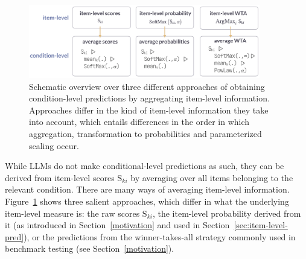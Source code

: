 \documentclass[fleqn]{article}
\begin{document}
\begin{figure}
  \centering
  \includegraphics[width=0.9\textwidth]{00-pics/measures-overview.png}
  \caption{
    Schematic overview over three different approaches of obtaining condition-level predictions by aggregating item-level information.
    Approaches differ in the kind of item-level information they take into account, which entails differences in the order in which aggregation, transformation to probabilities and parameterized scaling occur.
  }
  \label{fig:measures-overview}
\end{figure}

While LLMs do not make conditional-level predictions as such, they can be derived from item-level scores $\text{S}_{ki}$ by averaging over all items belonging to the relevant condition.
There are many ways of averaging item-level information.
Figure~\ref{fig:measures-overview} shows three salient approaches, which differ in what the underlying item-level measure is: the raw scores $\text{S}_{ki}$, the item-level probability derived from it (as introduced in Section~\ref{motivation} and used in Section~\ref{sec:item-level-pred}), or the predictions from the winner-takes-all strategy commonly used in benchmark testing (see Section~\ref{motivation}).

\end{document}

